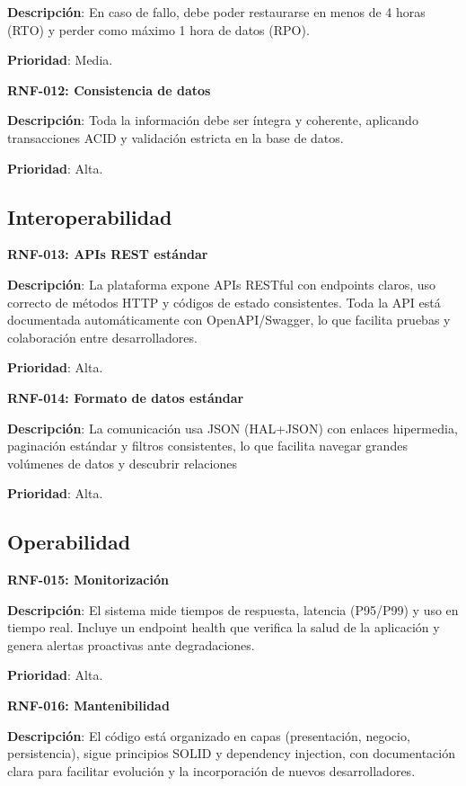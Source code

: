 \documentclass[12pt,a4paper,oneside]{report}
\begin{document}
\textbf{Descripción}: En caso de fallo, debe poder restaurarse en menos de 4 horas (RTO) y perder como máximo 1 hora de datos (RPO).

\textbf{Prioridad}: Media.

\textbf{RNF-012: Consistencia de datos}

\textbf{Descripción}: Toda la información debe ser íntegra y coherente, aplicando transacciones ACID y validación estricta en la base de datos.

\textbf{Prioridad}: Alta.

\subsection{Interoperabilidad}\label{interoperabilidad}

\textbf{RNF-013: APIs REST estándar}\label{apis-rest-estuxe1ndar}

\textbf{Descripción}: La plataforma expone APIs RESTful con endpoints claros, uso correcto de métodos HTTP y códigos de estado consistentes. Toda la API está documentada automáticamente con OpenAPI/Swagger, lo que facilita pruebas y colaboración entre desarrolladores.

\textbf{Prioridad}: Alta.

\textbf{RNF-014: Formato de datos estándar}\label{formato-de-datos-estuxe1ndar}

\textbf{Descripción}: La comunicación usa JSON (HAL+JSON) con enlaces hipermedia, paginación estándar y filtros consistentes, lo que facilita navegar grandes volúmenes de datos y descubrir relaciones

\textbf{Prioridad}: Alta.

\subsection{Operabilidad}\label{operabilidad}

\textbf{RNF-015: Monitorización}\label{monitorizaciuxf3n}

\textbf{Descripción}: El sistema mide tiempos de respuesta, latencia (P95/P99) y uso en tiempo real. Incluye un endpoint \/health que verifica la salud de la aplicación y genera alertas proactivas ante degradaciones.

\textbf{Prioridad}: Alta.

\textbf{RNF-016: Mantenibilidad}\label{mantenibilidad}

\textbf{Descripción}: El código está organizado en capas (presentación, negocio, persistencia), sigue principios SOLID y dependency injection, con documentación clara para facilitar evolución y la incorporación de nuevos desarrolladores.
\end{document}
